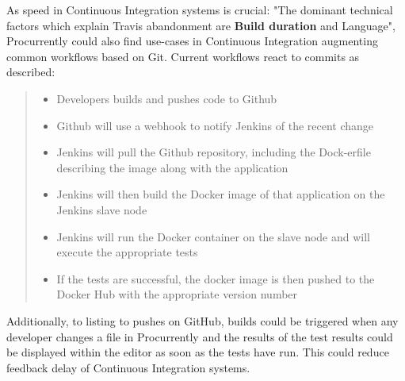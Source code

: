 As speed in Continuous Integration systems is crucial: "The dominant technical factors which explain Travis abandonment are \textbf{Build duration} and Language"\cite{8595199}, Procurrently could also find use-cases in Continuous Integration augmenting common workflows based on Git. 
Current workflows react to commits as described:

\blockquote[{\cite{8695332}}]{
    \begin{itemize}
        \item Developers builds and pushes code to Github
        \item Github will use a webhook to notify Jenkins of the recent change
        \item Jenkins will pull the Github repository, including the Dock-erfile describing the image along with the application
        \item Jenkins will then build the Docker image of that application on the Jenkins slave node
        \item Jenkins will run the Docker container on the slave node and will execute the appropriate tests
        \item If the tests are successful, the docker image is then pushed to the Docker Hub with the appropriate version number
    \end{itemize}
}

Additionally, to listing to pushes on GitHub, builds could be triggered when any developer changes a file in Procurrently and the results of the test results could be displayed within the editor as soon as the tests have run. This could reduce feedback delay of Continuous Integration systems.